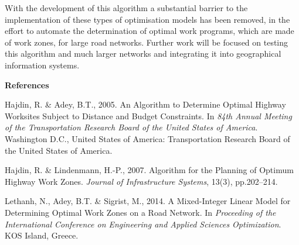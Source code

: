 \documentclass[10pt]{article}
\begin{document}
With the development of this algorithm a substantial barrier to the
implementation of these types of optimisation models has been removed, in the
effort to automate the determination of optimal work programs, which are made of
work zones, for large road networks. Further work will be focused on testing this
algorithm and much larger networks and integrating it into geographical
information systems.

\textbf{References}

Hajdin, R. \& Adey, B.T., 2005. An Algorithm to Determine Optimal Highway
Worksites Subject to Distance and Budget Constraints. In \textit{84th Annual
Meeting of the Transportation Research Board of the United States of America}.
Washington D.C., United States of America: Transportation Research Board of the
United States of America.

Hajdin, R. \& Lindenmann, H.-P., 2007. Algorithm for the Planning of Optimum
Highway Work Zones. \textit{Journal of Infrastructure Systems}, 13(3),
pp.202--214.

Lethanh, N., Adey, B.T. \& Sigrist, M., 2014. A Mixed-Integer Linear Model for
Determining Optimal Work Zones on a Road Network. In \textit{Proceeding of the
International Conference on Engineering and Applied Sciences Optimization}. KOS
Island, Greece.
\end{document}

